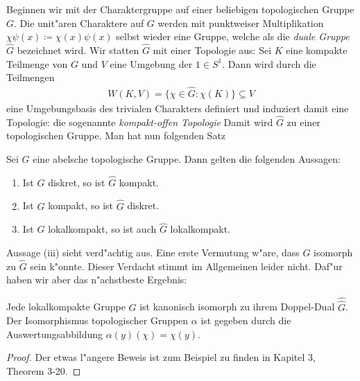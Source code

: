 	Beginnen wir mit der Charaktergruppe auf einer beliebigen topologischen Gruppe $G$.
	Die unit"aren Charaktere auf $G$ werden mit punktweiser Multiplikation $\chi\psi (x) \coloneqq \chi(x) \psi (x)$ selbst wieder eine Gruppe, welche als die \emph{duale Gruppe $\hat{G}$} bezeichnet wird.
	Wir statten $\hat{G}$ mit einer Topologie aus:
	Sei $K$ eine kompakte Teilmenge von $G$ und $V$ eine Umgebung der $1\in S^1$.
	Dann wird durch die Teilmengen
	\begin{align*}
		W(K, V) = \{ \chi\in \hat{G}: \chi(K)\} \subseteq V
	\end{align*}
	eine Umgebungsbasis des trivialen Charakters definiert und induziert damit eine Topologie: die sogenannte \emph{kompakt-offen Topologie}
	Damit wird $\hat{G}$ zu einer topologischen Gruppe.
	Man hat nun folgenden Satz
	\begin{satz} Sei $G$ eine abelsche topologische Gruppe. Dann gelten die folgenden Aussagen:
		\begin{enumerate}[label=\emph{(\roman*)}]
			\item Ist $G$ diskret, so ist $\hat{G}$ kompakt.
			\item Ist $G$ kompakt, so ist $\hat{G}$ diskret.
			\item Ist $G$ lokalkompakt, so ist auch $\hat{G}$ lokalkompakt.
		\end{enumerate}
	\end{satz}
	Aussage (iii) sieht verd"achtig aus.
	Eine erste Vermutung w"are, dass $G$ isomorph zu $\hat{G}$ sein k"onnte.
	Dieser Verdacht stimmt im Allgemeinen leider nicht. 
	Daf"ur haben wir aber das n"achstbeste Ergebnis:
	\begin{satz}
		Jede lokalkompakte Gruppe $G$ ist kanonisch isomorph zu ihrem Doppel-Dual $\hat{\hat{G}}$.
		Der Isomorphismus topologischer Gruppen $\alpha$ ist gegeben durch die Auswertungsabbildung $\alpha(y)(\chi) = \chi(y)$.
	\end{satz}
	\begin{proof}
		Der etwas l"angere Beweis ist zum Beispiel zu finden in \textcite{rama} Kapitel 3, Theorem 3-20.
	\end{proof}
	

